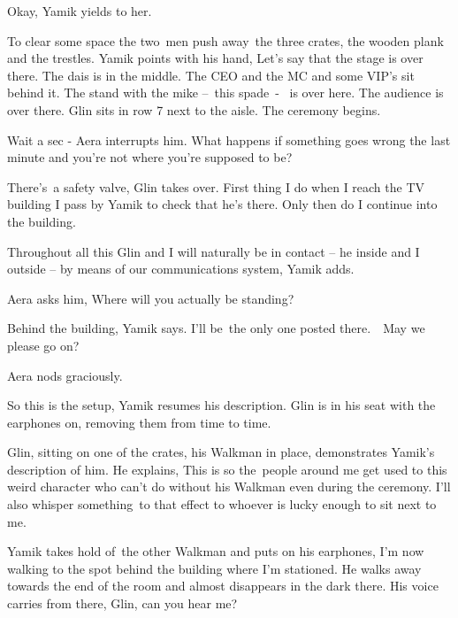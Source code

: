 \documentclass[letterpaper]{article}
\begin{document}
{\textquotedbl}Okay,{\textquotedbl} Yamik yields to her.\ 

To clear some space the two\  men push away\ the three crates, the wooden plank and the
trestles\textcolor[rgb]{0.0,0.4392157,0.7529412}{.} Yamik points with his hand, {\textquotedbl}Let's say that the stage
is over there. The dais is in the middle. The CEO and the MC and some VIP's sit behind it. The stand with the mike
--\ this spade\ {}- ~is over here. The audience is over there. Glin sits in row 7 next to the aisle. The ceremony
begins.{\textquotedbl} 

{\textquotedbl}Wait a sec - {\textquotedbl} Aera interrupts him. {\textquotedbl}What happens if something goes wrong the
last minute and you're not where you're supposed to be?{\textquotedbl} 

{\textquotedbl}There's~a safety valve,{\textquotedbl} Glin takes over. {\textquotedbl}First thing I do when I reach the
TV building I pass by Yamik to check that he's there. Only then do I continue into the building.{\textquotedbl} 

{\textquotedbl}Throughout all this Glin and I will naturally be in contact -- he inside and I outside --  by means of
our communications system,{\textquotedbl} Yamik adds.

Aera asks him, {\textquotedbl}Where will you actually be standing?{\textquotedbl} 

{\textquotedbl}Behind the building,{\textquotedbl} Yamik says. {\textquotedbl}I'll be~the only one posted
there.\textcolor[rgb]{0.0,0.4392157,0.7529412}{\ \ }May we please go on?{\textquotedbl}\ \ 

Aera nods graciously.

{\textquotedbl}So this is the setup,{\textquotedbl} Yamik resumes his description. {\textquotedbl}Glin is in his seat
with the earphones on, removing them from time to time.{\textquotedbl} 

Glin, sitting on one of the crates, his Walkman in place, demonstrates Yamik's description of him. He explains,
{\textquotedbl}This is so the\textcolor[rgb]{0.0,0.4392157,0.7529412}{\ }people around me get used to this weird
character who can't do without his Walkman even during the ceremony. I'll also whisper something~to that effect to
whoever is lucky enough to sit next to me.{\textquotedbl} 

Yamik takes hold of~the other Walkman and puts on his earphones, {\textquotedbl}I'm now walking to the spot behind the
building where I'm stationed.{\textquotedbl} He walks away towards the end of the room and almost disappears in the
dark there. His voice carries from there, {\textquotedbl}Glin, can you hear me?{\textquotedbl} 
\end{document}
